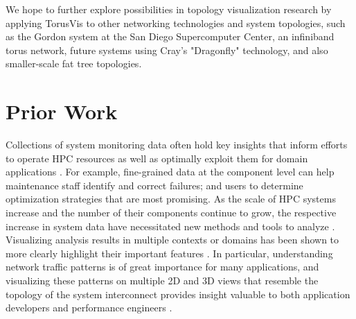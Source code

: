 \documentclass[
    10pt,
    conference,
    compsocconf
]{IEEEtran}
\begin{document}
    We hope to further explore possibilities in topology visualization research
    by applying TorusVis to other networking technologies and system topologies,
    such as the Gordon system at the San Diego Supercomputer Center, an
    infiniband torus network, future systems using Cray's "Dragonfly"
    technology, and also smaller-scale fat tree topologies.



\section{Prior Work}
    Collections of system monitoring data often hold key insights that inform
    efforts to operate HPC resources as well as optimally exploit them for
    domain applications \cite{Brandt:2009}.  For example, fine-grained data at
    the component level can help maintenance staff identify and correct
    failures; and users to determine optimization strategies that are most
    promising.  As the scale of HPC systems increase and the number of their
    components continue to grow, the respective increase in system data have
    necessitated new methods and tools to analyze
    \cite{Lee:2008,Muelder:2009,Schulz:2011}.  Visualizing analysis results in
    multiple contexts or domains has been shown to more clearly highlight their
    important features \cite{Schulz:2011,Bhatia:2005}.  In particular,
    understanding network traffic patterns is of great importance for many
    applications, and visualizing these patterns on multiple 2D and 3D views
    that resemble the topology of the system interconnect provides insight
    valuable to both application developers and performance engineers
    \cite{Landge:2012}.
\end{document}
